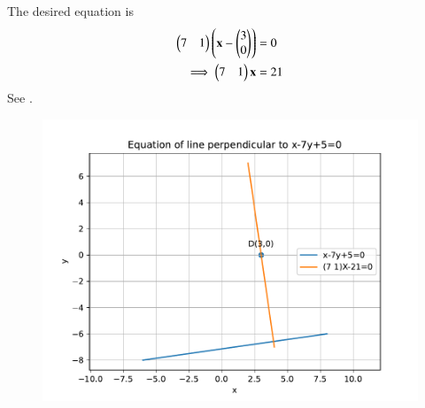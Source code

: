 The desired equation is
		\begin{align}
			\begin{pmatrix}7 & 1\end{pmatrix}\left(\mathbf{x}-\begin{pmatrix}3\\0\end{pmatrix}\right) &=0\\
		\implies 	\begin{pmatrix}7 & 1\end{pmatrix}\mathbf{x} &= 21
		\end{align}
		See 
.
		\begin{figure}[!h]
\begin{center}
\includegraphics[width=\columnwidth]{chapters/11/10/3/8/figs/fig.pdf}
\end{center}
\caption{}
\label{fig:chapters/11/10/3/8/Fig1}
\end{figure}
